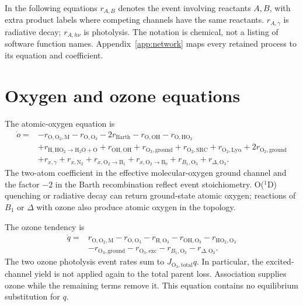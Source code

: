 In the following equations $r_{A,B}$ denotes the event involving reactants $A,B$, with extra product labels where competing channels have the same reactants. $r_{A,\gamma}$ is radiative decay; $r_{A,h\nu}$ is photolysis. The notation is chemical, not a listing of software function names. Appendix~\ref{app:network} maps every retained process to its equation and coefficient.

\section{Oxygen and ozone equations}
The atomic-oxygen equation is
\begin{align}
\dot o={}&-r_{\mathrm{O,O_2,M}}-r_{\mathrm{O,O_3}}-2r_{\mathrm{Barth}}
-r_{\mathrm{O,OH}}-r_{\mathrm{O,HO_2}} \nonumber\\
&+r_{\mathrm{H,HO_2\to H_2O+O}}+r_{\mathrm{OH,OH}}
+r_{\mathrm{O_3,ground}}+r_{\mathrm{O_2,SRC}}+r_{\mathrm{O_2,Ly\alpha}}
+2r_{\mathrm{O_2,ground}} \nonumber\\
&+r_{x,\gamma}+r_{x,\mathrm{N_2}}+r_{x,\mathrm{O_2\to B_1}}
+r_{x,\mathrm{O_2\to B_0}}+r_{B_1,\mathrm{O_3}}+r_{\Delta,\mathrm{O_3}}.
\label{eq:O}
\end{align}
The two-atom coefficient in the effective molecular-oxygen ground channel and the factor $-2$ in the Barth recombination reflect event stoichiometry. O($^1$D) quenching or radiative decay can return ground-state atomic oxygen; reactions of $B_1$ or $\Delta$ with ozone also produce atomic oxygen in the topology.

The ozone tendency is
\begin{align}
\dot q={}&r_{\mathrm{O,O_2,M}}-r_{\mathrm{O,O_3}}-r_{\mathrm{H,O_3}}
-r_{\mathrm{OH,O_3}}-r_{\mathrm{HO_2,O_3}}\nonumber\\
&-r_{\mathrm{O_3,ground}}-r_{\mathrm{O_3,exc}}
-r_{B_1,\mathrm{O_3}}-r_{\Delta,\mathrm{O_3}}.
\label{eq:O3}
\end{align}
The two ozone photolysis event rates sum to $J_{\mathrm{O_3,total}}q$. In particular, the excited-channel yield is not applied again to the total parent loss. Association supplies ozone while the remaining terms remove it. This equation contains no equilibrium substitution for $q$.


